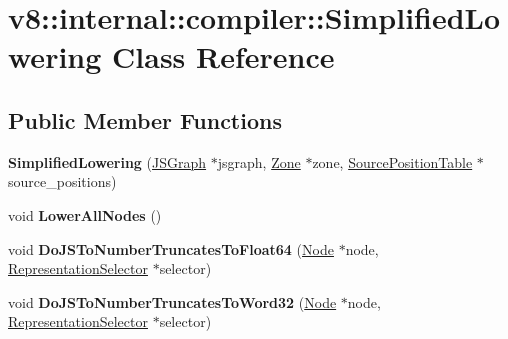 \hypertarget{classv8_1_1internal_1_1compiler_1_1_simplified_lowering}{}\section{v8\+:\+:internal\+:\+:compiler\+:\+:Simplified\+Lowering Class Reference}
\label{classv8_1_1internal_1_1compiler_1_1_simplified_lowering}
\subsection*{Public Member Functions}
\begin{DoxyCompactItemize}
\item 
{\bfseries Simplified\+Lowering} (\hyperlink{classv8_1_1internal_1_1compiler_1_1_j_s_graph}{J\+S\+Graph} $\ast$jsgraph, \hyperlink{classv8_1_1internal_1_1_zone}{Zone} $\ast$zone, \hyperlink{classv8_1_1internal_1_1compiler_1_1_source_position_table}{Source\+Position\+Table} $\ast$source\+\_\+positions)\hypertarget{classv8_1_1internal_1_1compiler_1_1_simplified_lowering_a82e8fa8e40fa4c31e94c724fbba5a61e}{}\label{classv8_1_1internal_1_1compiler_1_1_simplified_lowering_a82e8fa8e40fa4c31e94c724fbba5a61e}

\item 
void {\bfseries Lower\+All\+Nodes} ()\hypertarget{classv8_1_1internal_1_1compiler_1_1_simplified_lowering_aaa6438ebf75ae0cd397e843b3b9bc183}{}\label{classv8_1_1internal_1_1compiler_1_1_simplified_lowering_aaa6438ebf75ae0cd397e843b3b9bc183}

\item 
void {\bfseries Do\+J\+S\+To\+Number\+Truncates\+To\+Float64} (\hyperlink{classv8_1_1internal_1_1compiler_1_1_node}{Node} $\ast$node, \hyperlink{classv8_1_1internal_1_1compiler_1_1_representation_selector}{Representation\+Selector} $\ast$selector)\hypertarget{classv8_1_1internal_1_1compiler_1_1_simplified_lowering_aa6dfea62944d86f05932c6cc84b9e655}{}\label{classv8_1_1internal_1_1compiler_1_1_simplified_lowering_aa6dfea62944d86f05932c6cc84b9e655}

\item 
void {\bfseries Do\+J\+S\+To\+Number\+Truncates\+To\+Word32} (\hyperlink{classv8_1_1internal_1_1compiler_1_1_node}{Node} $\ast$node, \hyperlink{classv8_1_1internal_1_1compiler_1_1_representation_selector}{Representation\+Selector} $\ast$selector)\hypertarget{classv8_1_1internal_1_1compiler_1_1_simplified_lowering_a73ce24cb274bd6d634c4ec18c4060dc7}{}\label{classv8_1_1internal_1_1compiler_1_1_simplified_lowering_a73ce24cb274bd6d634c4ec18c4060dc7}


\end{DoxyCompactItemize}
